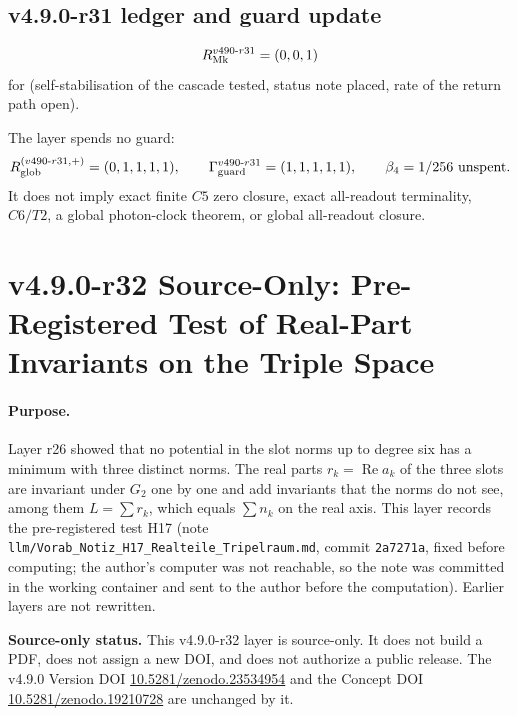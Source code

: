 \subsection*{v4.9.0-r31 ledger and guard update}
\label{subsec:v490-r31-ledger-guard}

\[
R_{\rm Mk}^{v490\text{-}r31}=(0,0,1)
\]
for (self-stabilisation of the cascade tested, status note placed, rate of the return path open).

The layer spends no guard:
\[
R_{\rm glob}^{(v490\text{-}r31,+)}=(0,1,1,1,1),
\qquad
\Gamma_{\rm guard}^{v490\text{-}r31}=(1,1,1,1,1),
\qquad
\beta_4=1/256\ \text{unspent}.
\]
It does not imply exact finite \(C5\) zero closure, exact all-readout terminality,
\(C6/T2\), a global photon-clock theorem, or global all-readout closure.

\clearpage
\section*{v4.9.0-r32 Source-Only: Pre-Registered Test of Real-Part Invariants on the Triple Space}
\label{sec:v490-r32-real-part-triple-space}

\paragraph{Purpose.}
Layer r26 showed that no potential in the slot norms up to degree six has a minimum with three distinct norms.  The real
parts \(r_k=\operatorname{Re}a_k\) of the three slots are invariant under \(G_2\) one by one and add invariants that
the norms do not see, among them \(L=\sum r_k\), which equals \(\sum n_k\) on the real axis.  This layer records the
pre-registered test H17 (note \texttt{llm/Vorab\_Notiz\_H17\_Realteile\_Tripelraum.md}, commit \texttt{2a7271a}, fixed
before computing; the author's computer was not reachable, so the note was committed in the working container and
sent to the author before the computation).  Earlier layers are not rewritten.

\noindent\textbf{Source-only status.}
This v4.9.0-r32 layer is source-only.  It does not build a PDF, does not assign a new DOI,
and does not authorize a public release.  The v4.9.0 Version DOI
\href{https://doi.org/10.5281/zenodo.23534954}{10.5281/zenodo.23534954} and the Concept DOI
\href{https://doi.org/10.5281/zenodo.19210728}{10.5281/zenodo.19210728} are unchanged by it.

